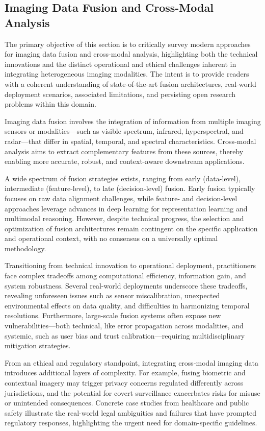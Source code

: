 \documentclass[sigconf]{acmart}
\begin{document}
\subsection{Imaging Data Fusion and Cross-Modal Analysis}

The primary objective of this section is to critically survey modern approaches for imaging data fusion and cross-modal analysis, highlighting both the technical innovations and the distinct operational and ethical challenges inherent in integrating heterogeneous imaging modalities. The intent is to provide readers with a coherent understanding of state-of-the-art fusion architectures, real-world deployment scenarios, associated limitations, and persisting open research problems within this domain.

Imaging data fusion involves the integration of information from multiple imaging sensors or modalities—such as visible spectrum, infrared, hyperspectral, and radar—that differ in spatial, temporal, and spectral characteristics. Cross-modal analysis aims to extract complementary features from these sources, thereby enabling more accurate, robust, and context-aware downstream applications.

A wide spectrum of fusion strategies exists, ranging from early (data-level), intermediate (feature-level), to late (decision-level) fusion. Early fusion typically focuses on raw data alignment challenges, while feature- and decision-level approaches leverage advances in deep learning for representation learning and multimodal reasoning. However, despite technical progress, the selection and optimization of fusion architectures remain contingent on the specific application and operational context, with no consensus on a universally optimal methodology.

Transitioning from technical innovation to operational deployment, practitioners face complex tradeoffs among computational efficiency, information gain, and system robustness. Several real-world deployments underscore these tradeoffs, revealing unforeseen issues such as sensor miscalibration, unexpected environmental effects on data quality, and difficulties in harmonizing temporal resolutions. Furthermore, large-scale fusion systems often expose new vulnerabilities—both technical, like error propagation across modalities, and systemic, such as user bias and trust calibration—requiring multidisciplinary mitigation strategies.

From an ethical and regulatory standpoint, integrating cross-modal imaging data introduces additional layers of complexity. For example, fusing biometric and contextual imagery may trigger privacy concerns regulated differently across jurisdictions, and the potential for covert surveillance exacerbates risks for misuse or unintended consequences. Concrete case studies from healthcare and public safety illustrate the real-world legal ambiguities and failures that have prompted regulatory responses, highlighting the urgent need for domain-specific guidelines.
\end{document}
